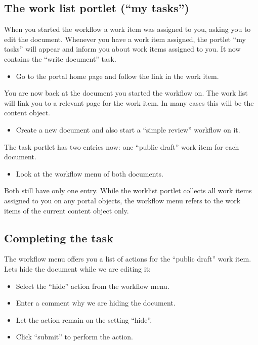 \subsection{The work list portlet (``my tasks'')}

When you started the workflow a work item was assigned to you, asking you to
edit the document.  Whenever you have a work item assigned, the portlet ``my
tasks'' will appear and inform you about work items assigned to you. It now
contains the ``write document'' task.

\begin{itemize}
\item Go to the portal home page and follow the link in the work item.
\end{itemize}

You are now back at the document you started the workflow on. The work list
will link you to a relevant page for the work item. In many cases this will be
the content object.

\begin{itemize}
\item Create a new document and also start a ``simple review'' workflow on it.
\end{itemize}

The task portlet has two entries now: one ``public draft'' work item for each
document.

\begin{itemize}
\item Look at the workflow menu of both documents.
\end{itemize}

Both still have only one entry. While the worklist portlet collects all work
items assigned to you on any portal objects, the workflow menu refers to the
work items of the current content object only.

\subsection{Completing the task}

The workflow menu offers you a list of actions for the ``public draft'' work item. Lets hide the document while we are editing it:

\begin{itemize}
    \item Select the ``hide'' action from the workflow menu.
    \item Enter a comment why we are hiding the document.
    \item Let the action remain on the setting ``hide''.
    \item Click ``submit'' to perform the action.
\end{itemize}

